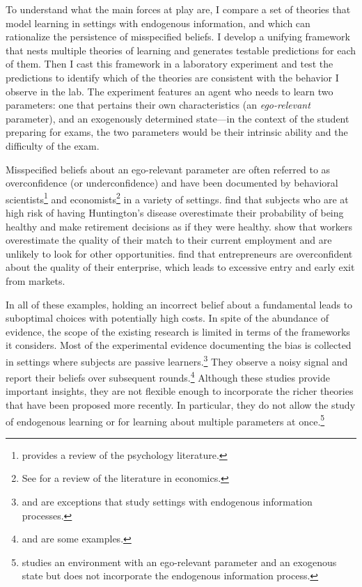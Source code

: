 \documentclass[
  12pt,
]{article}
\begin{document}
To understand what the main forces at play are, I compare a set of
theories that model learning in settings with endogenous information,
and which can rationalize the persistence of misspecified beliefs. I
develop a unifying framework that nests multiple theories of learning
and generates testable predictions for each of them. Then I cast this
framework in a laboratory experiment and test the predictions to
identify which of the theories are consistent with the behavior I
observe in the lab. The experiment features an agent who needs to learn
two parameters: one that pertains their own characteristics (an
\emph{ego-relevant} parameter), and an exogenously determined state---in
the context of the student preparing for exams, the two parameters would
be their intrinsic ability and the difficulty of the exam.

Misspecified beliefs about an ego-relevant parameter are often referred
to as overconfidence (or underconfidence) and have been documented by
behavioral scientists\footnote{\citet{kelley1980} 
provides a review of the psychology literature.} and
economists\footnote{See \citet{benjamin2019} 
for a review of the literature in economics.} in a variety of settings.
\citet{Oster2013} find that subjects who are at high risk of having
Huntington's disease overestimate their probability of being healthy and
make retirement decisions as if they were healthy. \citet{Hoffman2020}
show that workers overestimate the quality of their match to their
current employment and are unlikely to look for other opportunities.
\citet{Camerer1999} find that entrepreneurs are overconfident about the
quality of their enterprise, which leads to excessive entry and early
exit from markets.

In all of these examples, holding an incorrect belief about a
fundamental leads to suboptimal choices with potentially high costs. In
spite of the abundance of evidence, the scope of the existing research
is limited in terms of the frameworks it considers. Most of the
experimental evidence documenting the bias is collected in settings
where subjects are passive learners.\footnote{
\citet{Gotte2022} and \citet{Ozyilmaz2022} are exceptions that study settings with endogenous information processes.}
They observe a noisy signal and report their beliefs over subsequent
rounds.\footnote{\citet{Bracha2012} and 
\citet{Mobius2022} are some examples.} Although these studies provide
important insights, they are not flexible enough to incorporate the
richer theories that have been proposed more recently. In particular,
they do not allow the study of endogenous learning or for learning about
multiple parameters at once.\footnote{\citet{Coutts2020} 
studies an environment with an ego-relevant parameter and an exogenous state but does not 
incorporate the endogenous information process.}
\end{document}
